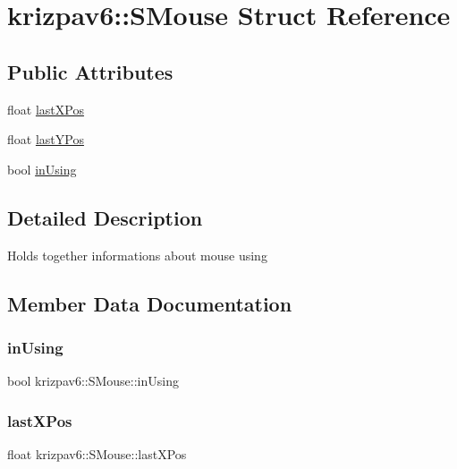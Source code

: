 \hypertarget{structkrizpav6_1_1_s_mouse}{}\section{krizpav6\+::S\+Mouse Struct Reference}
\label{structkrizpav6_1_1_s_mouse}
\subsection*{Public Attributes}
\begin{DoxyCompactItemize}
\item 
float \mbox{\hyperlink{structkrizpav6_1_1_s_mouse_a2e14dc1368dfc6a0195ac54958e29c2d}{last\+X\+Pos}}
\item 
float \mbox{\hyperlink{structkrizpav6_1_1_s_mouse_ae935b9d5f298750750a9f86a006fd479}{last\+Y\+Pos}}
\item 
bool \mbox{\hyperlink{structkrizpav6_1_1_s_mouse_a9e1d964915161eecf887b691c5ac299d}{in\+Using}}
\end{DoxyCompactItemize}


\subsection{Detailed Description}
Holds together informations about mouse using 

\subsection{Member Data Documentation}
\mbox{\label{structkrizpav6_1_1_s_mouse_a9e1d964915161eecf887b691c5ac299d}} 
\subsubsection{\texorpdfstring{inUsing}{inUsing}}
{\footnotesize\ttfamily bool krizpav6\+::\+S\+Mouse\+::in\+Using}

\mbox{\label{structkrizpav6_1_1_s_mouse_a2e14dc1368dfc6a0195ac54958e29c2d}} 
\subsubsection{\texorpdfstring{lastXPos}{lastXPos}}
{\footnotesize\ttfamily float krizpav6\+::\+S\+Mouse\+::last\+X\+Pos}

